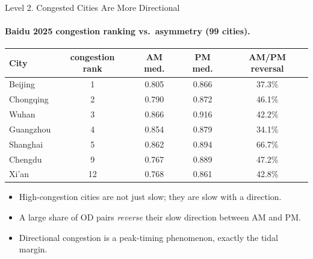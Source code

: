 \documentclass[11pt,aspectratio=169]{beamer}
\newcommand{\good}[1]{\textcolor{blue!70!black}{#1}}
\newcommand{\bad}[1]{\textcolor{red!70!black}{#1}}
\begin{document}
\begin{frame}{Level 2. Congested Cities Are More Directional}
\framesubtitle{Baidu 2025 congestion ranking vs.\ asymmetry (99 cities).}
\begin{center}\scriptsize
\begin{tabular}{lcccc}
\toprule
City & congestion rank & AM med. & PM med. & AM/PM reversal \\
\midrule
Beijing & 1 & \good{0.805} & 0.866 & 37.3\% \\
Chongqing & 2 & 0.790 & 0.872 & 46.1\% \\
Wuhan & 3 & 0.866 & 0.916 & 42.2\% \\
Guangzhou & 4 & 0.854 & 0.879 & 34.1\% \\
Shanghai & 5 & 0.862 & 0.894 & \good{66.7\%} \\
Chengdu & 9 & 0.767 & 0.889 & 47.2\% \\
Xi'an & 12 & 0.768 & 0.861 & 42.8\% \\
\bottomrule
\end{tabular}
\end{center}
\vspace{0.2em}
\begin{itemize}\footnotesize
  \item High-congestion cities are not just slow; they are slow \bad{with a direction}.
  \item A large share of OD pairs \emph{reverse} their slow direction between AM and PM.
  \item Directional congestion is a peak-timing phenomenon, exactly the tidal margin.
\end{itemize}
\end{frame}
\end{document}
